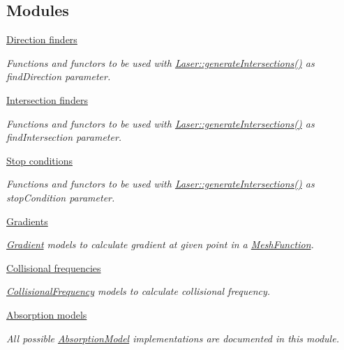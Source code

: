 \subsection*{Modules}
\begin{DoxyCompactItemize}
\item 
\hyperlink{group__directionFinders}{Direction finders}
\begin{DoxyCompactList}\small\item\em Functions and functors to be used with \hyperlink{classraytracer_1_1Laser_a40fd2b112fb1de646861d7e93ac303e3}{Laser\+::generate\+Intersections()} as find\+Direction parameter. \end{DoxyCompactList}\item 
\hyperlink{group__intersectionFinders}{Intersection finders}
\begin{DoxyCompactList}\small\item\em Functions and functors to be used with \hyperlink{classraytracer_1_1Laser_a40fd2b112fb1de646861d7e93ac303e3}{Laser\+::generate\+Intersections()} as find\+Intersection parameter. \end{DoxyCompactList}\item 
\hyperlink{group__stopConditions}{Stop conditions}
\begin{DoxyCompactList}\small\item\em Functions and functors to be used with \hyperlink{classraytracer_1_1Laser_a40fd2b112fb1de646861d7e93ac303e3}{Laser\+::generate\+Intersections()} as stop\+Condition parameter. \end{DoxyCompactList}\item 
\hyperlink{group__gradients}{Gradients}
\begin{DoxyCompactList}\small\item\em \hyperlink{classraytracer_1_1Gradient}{Gradient} models to calculate gradient at given point in a \hyperlink{classraytracer_1_1MeshFunction}{Mesh\+Function}. \end{DoxyCompactList}\item 
\hyperlink{group__frequency}{Collisional frequencies}
\begin{DoxyCompactList}\small\item\em \hyperlink{classraytracer_1_1CollisionalFrequency}{Collisional\+Frequency} models to calculate collisional frequency. \end{DoxyCompactList}\item 
\hyperlink{group__absorption}{Absorption models}
\begin{DoxyCompactList}\small\item\em All possible \hyperlink{classraytracer_1_1AbsorptionModel}{Absorption\+Model} implementations are documented in this module. \end{DoxyCompactList}\end{DoxyCompactItemize}
